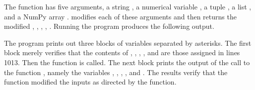 \documentclass[letterpaper,10pt,english]{sphinxmanual}
\begin{document}
\sphinxAtStartPar
The function  has five arguments, a string , a numerical variable , a tuple , a list , and a NumPy array .   modifies each of these arguments and then returns the modified , , , , .  Running the program produces the following output.

\begin{sphinxVerbatim}[commandchars=\\\{\},numbers=left,firstnumber=1,stepnumber=1]
 
\end{sphinxVerbatim}

\sphinxAtStartPar
The program prints out three blocks of variables separated by asterisks.  The first block merely verifies that the contents of , , , , and  are those assigned in lines 10\sphinxhyphen{}13.  Then the function  is called.  The next block prints the output of the call to the function , namely the variables  , , , , and .  The results verify that the function modified the inputs as directed by the  function.
\end{document}
